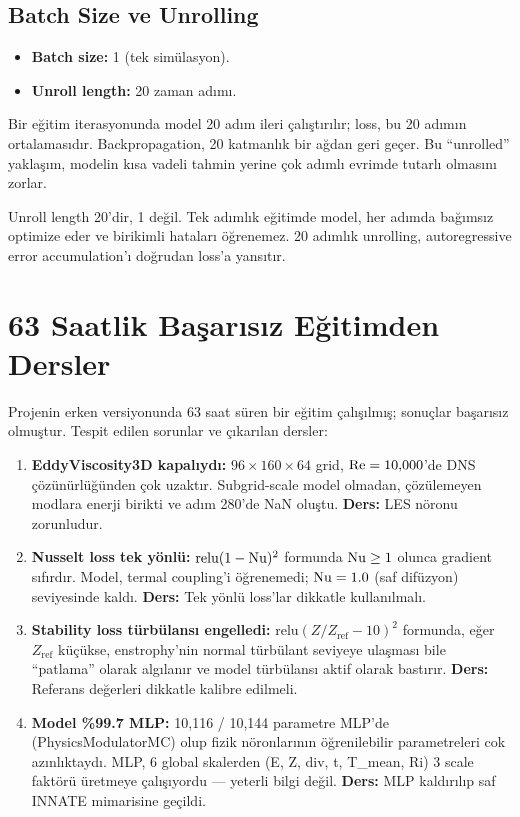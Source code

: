 \subsection{Batch Size ve Unrolling}

\begin{itemize}
    \item \textbf{Batch size:} 1 (tek simülasyon).
    \item \textbf{Unroll length:} 20 zaman adımı.
\end{itemize}

Bir eğitim iterasyonunda model 20 adım ileri çalıştırılır; loss, bu 20 adımın ortalamasıdır. Backpropagation, 20 katmanlık bir ağdan geri geçer. Bu ``unrolled'' yaklaşım, modelin kısa vadeli tahmin yerine çok adımlı evrimde tutarlı olmasını zorlar.

\begin{remark}
Unroll length 20'dir, 1 değil. Tek adımlık eğitimde model, her adımda bağımsız optimize eder ve birikimli hataları öğrenemez. 20 adımlık unrolling, autoregressive error accumulation'ı doğrudan loss'a yansıtır.
\end{remark}


\section{63 Saatlik Başarısız Eğitimden Dersler}
\label{sec:basarisiz_egitim}

Projenin erken versiyonunda 63 saat süren bir eğitim çalışılmış; sonuçlar başarısız olmuştur. Tespit edilen sorunlar ve çıkarılan dersler:

\begin{enumerate}
    \item \textbf{EddyViscosity3D kapalıydı:} $96 \times 160 \times 64$ grid, $\mathrm{Re} = 10{,}000$'de DNS çözünürlüğünden çok uzaktır. Subgrid-scale model olmadan, çözülemeyen modlara enerji birikti ve adım 280'de NaN oluştu. \textbf{Ders:} LES nöronu zorunludur.

    \item \textbf{Nusselt loss tek yönlü:} $\text{relu}(1 - \mathrm{Nu})^2$ formunda $\mathrm{Nu} \geq 1$ olunca gradient sıfırdır. Model, termal coupling'i öğrenemedi; $\mathrm{Nu} = 1.0$ (saf difüzyon) seviyesinde kaldı. \textbf{Ders:} Tek yönlü loss'lar dikkatle kullanılmalı.

    \item \textbf{Stability loss türbülansı engelledi:} $\text{relu}(Z/Z_{\text{ref}} - 10)^2$ formunda, eğer $Z_{\text{ref}}$ küçükse, enstrophy'nin normal türbülant seviyeye ulaşması bile ``patlama'' olarak algılanır ve model türbülansı aktif olarak bastırır. \textbf{Ders:} Referans değerleri dikkatle kalibre edilmeli.

    \item \textbf{Model \%99.7 MLP:} 10,116 / 10,144 parametre MLP'de (PhysicsModulatorMC) olup fizik nöronlarının öğrenilebilir parametreleri cok azınlıktaydı. MLP, 6 global skalerden (E, Z, div, t, T\_mean, Ri) 3 scale faktörü üretmeye çalışıyordu --- yeterli bilgi değil. \textbf{Ders:} MLP kaldırılıp saf INNATE mimarisine geçildi.
\end{enumerate}


